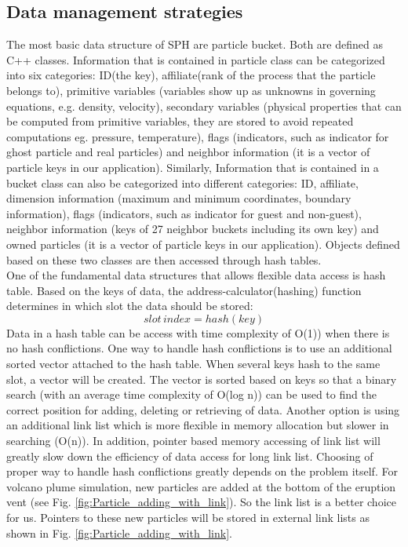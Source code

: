 \documentclass[procedia]{easychair}
\begin{document}
\subsection{Data management strategies}
The most basic data structure of SPH are particle bucket. Both are defined as C++ classes. Information that is contained in particle class can be categorized into six categories: ID(the key), affiliate(rank of the process that the particle belongs to), primitive variables (variables show up as unknowns in governing equations, e.g. density, velocity), secondary variables (physical properties that can be computed from primitive variables, they are stored to avoid repeated computations eg. pressure, temperature), flags (indicators, such as indicator for ghost particle and real particles) and neighbor information (it is a vector of particle keys in our application). Similarly,  Information that is contained in  a bucket class can also be categorized into different categories: ID, affiliate, dimension information (maximum and minimum coordinates, boundary information), flags (indicators, such as indicator for guest and non-guest), neighbor information (keys of 27 neighbor buckets including its own key) and owned particles (it is a vector of particle keys in our application). Objects defined based on these two classes are then accessed through hash tables.\\
One of the fundamental data structures that allows flexible data access is hash table. Based on the keys of data, the address-calculator(hashing) function determines in which slot the data should be stored:
\begin{equation}
slot\,index = hash(key)
\end{equation}
Data in a hash table can be access with time complexity of O(1)) when there is no hash conflictions. One way to handle hash conflictions is to use an additional sorted vector attached to the hash table. When several keys hash to the same slot, a vector will be created. The vector is sorted based on keys so that a binary search (with an average time complexity of O(log n)) can be used to find the correct position for adding, deleting or retrieving of data. Another option is using an additional link list which is more flexible in memory allocation but slower in searching (O(n)). In addition, pointer based memory accessing of link list will greatly slow down the efficiency of data access for long link list. Choosing of proper way to handle hash conflictions greatly depends on the problem itself. For volcano plume simulation, new particles are added at the bottom of the eruption vent (see Fig. \ref{fig:Particle_adding_with_link}). So the link list is a better choice for us. Pointers to these new particles will be stored in external link lists as shown in Fig. \ref{fig:Particle_adding_with_link}.
\end{document}
